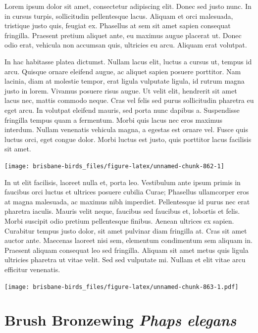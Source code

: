 \documentclass[]{book}
\let\origfigure\figure
\let\endorigfigure\endfigure
\renewenvironment{figure}[1][2] {
  \expandafter\origfigure\expandafter[H]
} {
  \endorigfigure
}
\begin{document}
Lorem ipsum dolor sit amet, consectetur adipiscing elit. Donec sed justo
nunc. In in cursus turpis, sollicitudin pellentesque lacus. Aliquam et
orci malesuada, tristique justo quis, feugiat ex. Phasellus at sem sit
amet sapien consequat fringilla. Praesent pretium aliquet ante, eu
maximus augue placerat ut. Donec odio erat, vehicula non accumsan quis,
ultricies eu arcu. Aliquam erat volutpat.

In hac habitasse platea dictumst. Nullam lacus elit, luctus a cursus ut,
tempus id arcu. Quisque ornare eleifend augue, ac aliquet sapien posuere
porttitor. Nam lacinia, diam at molestie tempor, erat ligula vulputate
ligula, id rutrum magna justo in lorem. Vivamus posuere risus augue. Ut
velit elit, hendrerit sit amet lacus nec, mattis commodo neque. Cras vel
felis sed purus sollicitudin pharetra eu eget arcu. In volutpat eleifend
mauris, sed porta nunc dapibus a. Suspendisse fringilla tempus quam a
fermentum. Morbi quis lacus nec eros maximus interdum. Nullam venenatis
vehicula magna, a egestas est ornare vel. Fusce quis luctus orci, eget
congue dolor. Morbi luctus est justo, quis porttitor lacus facilisis sit
amet.

\begin{figure}
\texttt{[image: brisbane-birds\_files/figure-latex/unnamed-chunk-862-1]} \caption{insert figure caption}\label{fig:unnamed-chunk-862}
\end{figure}

In ut elit facilisis, laoreet nulla et, porta leo. Vestibulum ante ipsum
primis in faucibus orci luctus et ultrices posuere cubilia Curae;
Phasellus ullamcorper eros at magna malesuada, ac maximus nibh
imperdiet. Pellentesque id purus nec erat pharetra iaculis. Mauris velit
neque, faucibus sed faucibus et, lobortis et felis. Morbi suscipit odio
pretium pellentesque finibus. Aenean ultrices ex sapien. Curabitur
tempus justo dolor, sit amet pulvinar diam fringilla at. Cras sit amet
auctor ante. Maecenas laoreet nisi sem, elementum condimentum sem
aliquam in. Praesent aliquam consequat leo sed fringilla. Aliquam sit
amet metus quis ligula ultricies pharetra ut vitae velit. Sed sed
vulputate mi. Nullam et elit vitae arcu efficitur venenatis.

\begin{figure}
\centering
\texttt{[image: brisbane-birds\_files/figure-latex/unnamed-chunk-863-1.pdf]}
\caption{\label{fig:unnamed-chunk-863}insert figure caption}
\end{figure}

\section{\texorpdfstring{Brush Bronzewing \emph{Phaps
elegans}}{Brush Bronzewing Phaps elegans}}\label{brush-bronzewing-phaps-elegans}
\end{document}
